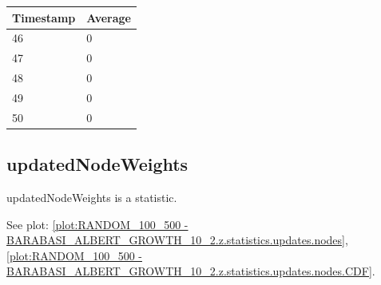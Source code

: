 \begin{tabular}{|l||l|}
\hline
	\textbf{Timestamp} & \textbf{Average} \\ \hline
	46 & 0 \\ \hline
	47 & 0 \\ \hline
	48 & 0 \\ \hline
	49 & 0 \\ \hline
	50 & 0 \\ \hline
\end{tabular}

\subsection{updatedNodeWeights}
updatedNodeWeights is a statistic.

See plot: \ref{plot:RANDOM_100_500 - BARABASI_ALBERT_GROWTH_10_2.z.statistics.updates.nodes}, \ref{plot:RANDOM_100_500 - BARABASI_ALBERT_GROWTH_10_2.z.statistics.updates.nodes.CDF}.


